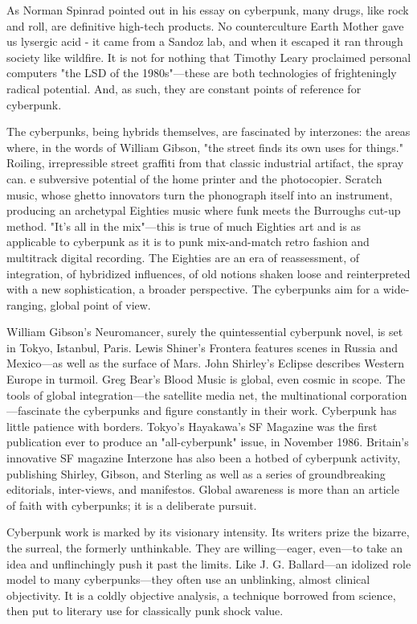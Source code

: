 As Norman Spinrad pointed out in his essay on cyberpunk, many drugs, like rock and roll, are definitive high-tech products. No counterculture Earth Mother gave us lysergic acid - it came from a Sandoz lab, and when it escaped it ran through society like wildfire. It is not for nothing that Timothy Leary proclaimed personal computers "the LSD of the 1980s"—these are both technologies of frighteningly radical potential. And, as such, they are constant points of reference for cyberpunk.

The cyberpunks, being hybrids themselves, are fascinated by interzones: the areas where, in the words of William Gibson, "the street finds its own uses for things." Roiling, irrepressible street graffiti from that classic industrial artifact, the spray can. e subversive potential of the home printer and the photocopier. Scratch music, whose ghetto innovators turn the phonograph itself into an instrument, producing an archetypal Eighties music where funk meets the Burroughs cut-up method. "It's all in the mix"—this is true of much Eighties art and is as applicable to cyberpunk as it is to punk mix-and-match retro fashion and multitrack digital recording.
The Eighties are an era of reassessment, of integration, of hybridized influences, of old notions shaken loose and reinterpreted with a new sophistication, a broader perspective. The cyberpunks aim for a wide-ranging, global point of view.

William Gibson's Neuromancer, surely the quintessential cyberpunk novel, is set in Tokyo, Istanbul, Paris. Lewis Shiner's Frontera features scenes in Russia and Mexico—as well as the surface of Mars. John Shirley's Eclipse describes Western Europe in turmoil. Greg Bear's Blood Music is global, even cosmic in scope.
The tools of global integration—the satellite media net, the multinational corporation—fascinate the cyberpunks and figure constantly in their work. Cyberpunk has little patience with borders. Tokyo's Hayakawa's SF Magazine was the first publication ever to produce an "all-cyberpunk" issue, in November 1986. Britain's innovative SF magazine Interzone has also been a hotbed of cyberpunk activity, publishing Shirley, Gibson, and Sterling as well as a series of groundbreaking editorials, inter-views, and manifestos. Global awareness is more than an article of faith with cyberpunks; it is a deliberate pursuit.

Cyberpunk work is marked by its visionary intensity. Its writers prize the bizarre, the surreal, the formerly unthinkable. They are willing—eager, even—to take an idea and unflinchingly push it past the limits. Like J. G. Ballard—an idolized role model to many cyberpunks—they often use an unblinking, almost clinical objectivity. It is a coldly objective analysis, a technique borrowed from science, then put to literary use for classically punk shock value.

